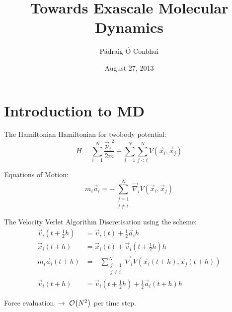 \documentclass[xcolor={usenames, svgnames}]{beamer}
\title[Exascale MD]{Towards Exascale Molecular Dynamics}
\author[P. O Conbhui]{P\'{a}draig \'{O} Conbhu\'{\i}}
\date[August 2013]{August 27, 2013}
\begin{document}
\begin{frame}[plain]
    \titlepage
\end{frame}


\section{Introduction to MD}

\begin{frame}{The Hamiltonian}
    Hamiltonian for twobody potential:
    \begin{equation}
        H = \sum_{i=1}^N \frac{\vec{p}_i^{,2}}{2 m}
            + \sum_{i=1}^N \sum_{j<i}^N V(\vec{x}_i, \vec{x}_j)
    \end{equation}
    
    Equations of Motion:
    \begin{equation}
        m_i \vec{a}_i = -\sum_{\substack{j=1\\j\ne{}i}}^N
                        \vec{\nabla}_i V(\vec{x}_i, \vec{x}_j)
    \end{equation}
\end{frame}


\begin{frame}{The Velocity Verlet Algorithm}
    Discretisation using the \velocityverlet{} scheme:
    \begin{subequations}
    \label{eqn:velocity_verlet_scheme}
    \begin{align}
        \vec{v}_i(t + \tfrac{1}{2} h) &=
            \vec{v}_i(t) + \tfrac{1}{2}\vec{a}_i h
        \label{eqn:velocity_verlet_v1_update}
        \\
        \vec{x}_i(t + h) &=
            \vec{x}_i(t) + \vec{v}_i(t + \tfrac{1}{2} h) h
        \label{eqn:velocity_verlet_position_update}
        \\
        m_i \vec{a}_i(t + h) &=
            - \sum_{\substack{j=1\\j\ne{}i}}^N
                \vec{\nabla}_i V(\vec{x}_i(t+h), \vec{x}_j(t+h))
        \label{eqn:velocity_verlet_force_eval}
        \\
        \vec{v}_i(t+h) &=
            \vec{v}_i(t + \tfrac{1}{2} h) + \tfrac{1}{2} \vec{a}_i(t + h) h
        \label{eqn:velocity_verlet_v2_update}
    \end{align}
    \end{subequations}

    Force evaluation $\rightarrow{}$ $\mathcal{O}{\left({ N^2 }\right)}$ per time step.
\end{frame}
\end{document}
